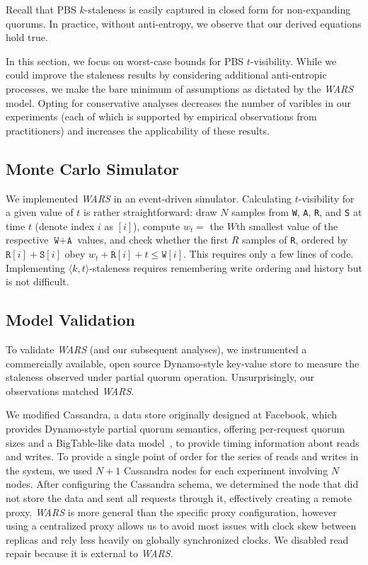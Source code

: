 \documentclass{vldb}
\begin{document}
Recall that PBS $k$-staleness is easily captured in closed form for
non-expanding quorums.  In practice, without anti-entropy, we observe
that our derived equations hold true.

In this section, we focus on worst-case bounds for PBS $t$-visibility.  While
we could improve the staleness results by considering additional
anti-entropic processes, we make the bare minimum of assumptions as
dictated by the \textit{WARS}  model.  Opting for conservative analyses
decreases the number of varibles in our experiments (each of which is
supported by empirical observations from practitioners) and increases
the applicability of these results.

\subsection{Monte Carlo Simulator}

We implemented \textit{WARS} in an event-driven simulator.
Calculating $t$-visibility for a given value of $t$ is rather
straightforward: draw $N$ samples from \texttt{W}, \texttt{A},
\texttt{R}, and \texttt{S} at time $t$ (denote index $i$ as $[i]$),
compute $w_t = $ the $W$th smallest value of the respective
$\texttt{W}+\texttt{A}$ values, and check whether the first $R$
samples of \texttt{R}, ordered by $\texttt{R}[i]+\texttt{S}[i]$ obey
$w_t+\texttt{R}[i] + t\leq \texttt{W}[i]$.  This requires only a few
lines of code.  Implementing $\langle k, t \rangle$-staleness requires
remembering write ordering and history but is not difficult.

\subsection{Model Validation}

To validate \textit{WARS}  (and our subsequent analyses), we instrumented a
commercially available, open source Dynamo-style key-value store to
measure the staleness observed under partial quorum operation.
Unsurprisingly, our observations matched \textit{WARS}.

We modified Cassandra, a data store originally designed at Facebook,
which provides Dynamo-style partial quorum semantics, offering
per-request quorum sizes and a BigTable-like data
model~\cite{cassandra, cassandra-sigmod}, to provide timing
information about reads and writes.  To provide a single point of
order for the series of reads and writes in the system, we used $N+1$
Cassandra nodes for each experiment involving $N$ nodes.  After
configuring the Cassandra schema, we determined the node that did not
store the data and sent all requests through it, effectively creating
a remote proxy.  \textit{WARS} is more general than the specific proxy
configuration, however using a centralized proxy allows us to avoid
most issues with clock skew between replicas and rely less heavily on
globally synchronized clocks.  We disabled read repair because it is
external to \textit{WARS}.
\end{document}
